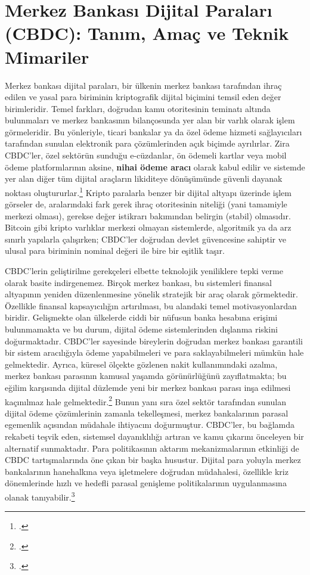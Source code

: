 \documentclass[a4paper,12pt]{article}
\begin{document}
\section{Merkez Bankası Dijital Paraları (CBDC): Tanım, Amaç ve Teknik Mimariler}

Merkez bankası dijital paraları, bir ülkenin merkez bankası tarafından ihraç edilen ve yasal para biriminin kriptografik dijital biçimini temsil eden değer birimleridir. Temel farkları, doğrudan kamu otoritesinin teminatı altında bulunmaları ve merkez bankasının bilançosunda yer alan bir varlık olarak işlem görmeleridir. Bu yönleriyle, ticari bankalar ya da özel ödeme hizmeti sağlayıcıları tarafından sunulan elektronik para çözümlerinden açık biçimde ayrılırlar. Zira CBDC’ler, özel sektörün sunduğu e-cüzdanlar, ön ödemeli kartlar veya mobil ödeme platformlarının aksine, \textbf{nihai ödeme aracı} olarak kabul edilir ve sistemde yer alan diğer tüm dijital araçların likiditeye dönüşümünde güvenli dayanak noktası oluştururlar.\footcite{bis2023cbdc} Kripto paralarla benzer bir dijital altyapı üzerinde işlem görseler de, aralarındaki fark gerek ihraç otoritesinin niteliği (yani tamamiyle merkezi olması), gerekse değer istikrarı bakımından belirgin (stabil) olmasıdır. Bitcoin gibi kripto varlıklar merkezi olmayan sistemlerde, algoritmik ya da arz sınırlı yapılarla çalışırken; CBDC’ler doğrudan devlet güvencesine sahiptir ve ulusal para biriminin nominal değeri ile bire bir eşitlik taşır.

CBDC’lerin geliştirilme gerekçeleri elbette teknolojik yeniliklere tepki verme olarak basite indirgenemez. Birçok merkez bankası, bu sistemleri finansal altyapının yeniden düzenlenmesine yönelik stratejik bir araç olarak görmektedir. Özellikle finansal kapsayıcılığın artırılması, bu alandaki temel motivasyonlardan biridir. Gelişmekte olan ülkelerde ciddi bir nüfusun banka hesabına erişimi bulunmamakta ve bu durum, dijital ödeme sistemlerinden dışlanma riskini doğurmaktadır. CBDC'ler sayesinde bireylerin doğrudan merkez bankası garantili bir sistem aracılığıyla ödeme yapabilmeleri ve para saklayabilmeleri mümkün hale gelmektedir. Ayrıca, küresel ölçekte gözlenen nakit kullanımındaki azalma, merkez bankası parasının kamusal yaşamda görünürlüğünü zayıflatmakta; bu eğilim karşısında dijital düzlemde yeni bir merkez bankası parası inşa edilmesi kaçınılmaz hale gelmektedir.\footcite{ecb2023digital} Bunun yanı sıra özel sektör tarafından sunulan dijital ödeme çözümlerinin zamanla tekelleşmesi, merkez bankalarının parasal egemenlik açısından müdahale ihtiyacını doğurmuştur. CBDC’ler, bu bağlamda rekabeti teşvik eden, sistemsel dayanıklılığı artıran ve kamu çıkarını önceleyen bir alternatif sunmaktadır. Para politikasının aktarım mekanizmalarının etkinliği de CBDC tartışmalarında öne çıkan bir başka husustur. Dijital para yoluyla merkez bankalarının hanehalkına veya işletmelere doğrudan müdahalesi, özellikle kriz dönemlerinde hızlı ve hedefli parasal genişleme politikalarının uygulanmasına olanak tanıyabilir.\footcite{mas2023orchid}
\end{document}
